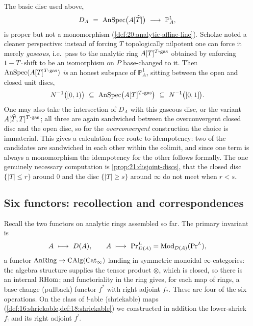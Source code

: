 \begin{remark}
\label{rmk:21:disc-variants}
The basic disc used above,
\begin{equation*}
D_A\ =\ \AnSpec\bigl(A[\widehat T]\bigr)\ \longrightarrow\ \mathbb P^1_A ,
\end{equation*}
is proper but not a monomorphism (\cref{def:20:analytic-affine-line}). Scholze
noted a cleaner perspective: instead of forcing $T$ topologically nilpotent one
can force it merely \emph{gaseous}, i.e.\ pass to the analytic ring
$A[T]^{T\text{-}\mathrm{gas}}$ obtained by enforcing $1-T\cdot\mathrm{shift}$ to be an
isomorphism on $P$ base-changed to it. Then $\operatorname{AnSpec}(A[T]^{T\text{-}\mathrm{gas}})$
\emph{is} an honest subspace of $\mathbb P^1_A$, sitting between the open and
closed unit discs,
\begin{equation*}
N^{-1}\bigl([0,1)\bigr)\ \subseteq\ \AnSpec\bigl(A[T]^{T\text{-}\gasx}\bigr)\
\subseteq\ N^{-1}\bigl([0,1]\bigr).
\end{equation*}
One may also take the intersection of $D_A$ with this gaseous disc, or the
variant $A[\widehat T, T]^{T\text{-}\mathrm{gas}}$; all three are again sandwiched
between the overconvergent closed disc and the open disc, so for the
\emph{overconvergent} construction the choice is immaterial. This gives a
calculation-free route to idempotency: two of the candidates are sandwiched in
each other within the colimit, and since one term is always a monomorphism the
idempotency for the other follows formally. The one genuinely necessary
computation is \cref{prop:21:disjoint-discs}, that the closed disc
$\{|T|\le r\}$ around $0$ and the disc $\{|T|\ge s\}$ around $\infty$ do not
meet when $r<s$.
\end{remark}

\subsection{Six functors: recollection and correspondences}
\label{subsec:21:six-functors}

Recall the two functors on analytic rings assembled so far. The primary
invariant is
\begin{equation*}
A\ \longmapsto\ D(A),\qquad A\ \longmapsto\ \PrL_{D(A)}=\Mod_{D(A)}(\PrL),
\end{equation*}
a functor $\operatorname{AnRing}\to\operatorname{CAlg}(\mathrm{Cat}_{\infty})$ landing in symmetric monoidal
$\infty$-categories: the algebra structure supplies the tensor product $\otimes$,
which is closed, so there is an internal $\mathrm{RHom}$; and functoriality in the ring
gives, for each map of rings, a base-change (pullback) functor $f^{*}$ with right
adjoint $f_{*}$. These are four of the six operations. On the class of
$!$-able (shriekable) maps (\cref{def:16:shriekable,def:18:shriekable}) we
constructed in addition the lower-shriek $f_{!}$ and its right adjoint $f^{!}$.

